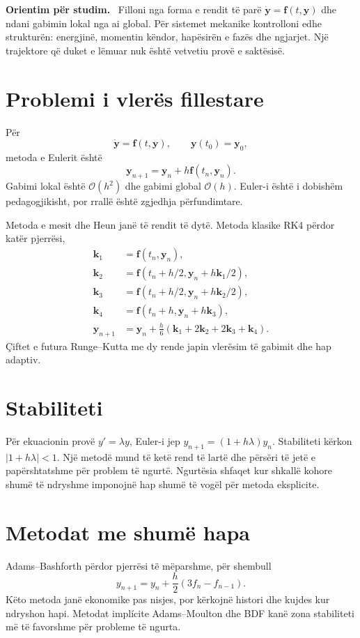 \documentclass[11pt,oneside,openany]{book}
\newcommand{\vect}[1]{\bm{#1}}
\newcommand{\Oh}{\mathcal{O}}
\newenvironment{orientim}{\par\medskip\noindent\textbf{Orientim për studim.}\ }{\par\medskip}
\begin{document}
\begin{orientim}
Filloni nga forma e rendit të parë $\dot{\vect y}=\vect f(t,\vect y)$ dhe
ndani gabimin lokal nga ai global. Për sistemet mekanike kontrolloni edhe
strukturën: energjinë, momentin këndor, hapësirën e fazës dhe ngjarjet. Një
trajektore që duket e lëmuar nuk është vetvetiu provë e saktësisë.
\end{orientim}


\section{Problemi i vlerës fillestare}
Për
\begin{equation}
 \dot{\vect y}=\vect f(t,\vect y),\qquad \vect y(t_0)=\vect y_0,
\end{equation}
metoda e Eulerit është
\begin{equation}
 \vect y_{n+1}=\vect y_n+h\vect f(t_n,\vect y_n).
\end{equation}
Gabimi lokal është $\Oh(h^2)$ dhe gabimi global $\Oh(h)$. Euler-i është i dobishëm pedagogjikisht, por rrallë është zgjedhja përfundimtare.

Metoda e mesit dhe Heun janë të rendit të dytë. Metoda klasike RK4 përdor katër pjerrësi,
\begin{align}
 \vect k_1&=\vect f(t_n,\vect y_n),\\
 \vect k_2&=\vect f(t_n+h/2,\vect y_n+h\vect k_1/2),\\
 \vect k_3&=\vect f(t_n+h/2,\vect y_n+h\vect k_2/2),\\
 \vect k_4&=\vect f(t_n+h,\vect y_n+h\vect k_3),\\
 \vect y_{n+1}&=\vect y_n+\frac h6(\vect k_1+2\vect k_2+2\vect k_3+\vect k_4).
\end{align}
Çiftet e futura Runge--Kutta me dy rende japin vlerësim të gabimit dhe hap adaptiv.

\section{Stabiliteti}
Për ekuacionin provë $y'=\lambda y$, Euler-i jep $y_{n+1}=(1+h\lambda)y_n$. Stabiliteti kërkon $|1+h\lambda|<1$. Një metodë mund të ketë rend të lartë dhe përsëri të jetë e papërshtatshme për problem të ngurtë. Ngurtësia shfaqet kur shkallë kohore shumë të ndryshme imponojnë hap shumë të vogël për metoda eksplicite.

\section{Metodat me shumë hapa}
Adams--Bashforth përdor pjerrësi të mëparshme, për shembull
\begin{equation}
 y_{n+1}=y_n+\frac h2(3f_n-f_{n-1}).
\end{equation}
Këto metoda janë ekonomike pas nisjes, por kërkojnë histori dhe kujdes kur ndryshon hapi. Metodat implícite Adams--Moulton dhe BDF kanë zona stabiliteti më të favorshme për probleme të ngurta.
\end{document}
